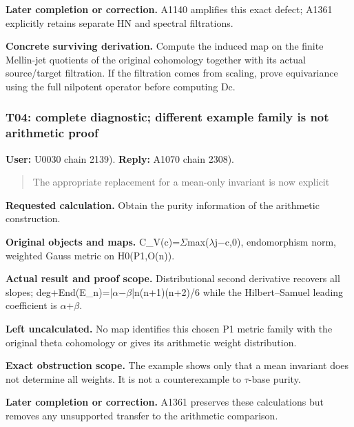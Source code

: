 \documentclass[10pt,a4paper,oneside]{report}
\begin{document}
\textbf{Later completion or correction.} A1140 amplifies this exact
defect; A1361 explicitly retains separate HN and spectral filtrations.

\textbf{Concrete surviving derivation.} Compute the induced map on the
finite Mellin-jet quotients of the original cohomology together with its
actual source/target filtration. If the filtration comes from scaling,
prove equivariance using the full nilpotent operator before computing
Dc.

\subsubsection{T04: complete diagnostic; different example family is not
arithmetic
proof}\label{t04-complete-diagnostic-different-example-family-is-not-arithmetic-proof}

\textbf{User:} U0030
\protect{} chain 2139).
\textbf{Reply:} A1070
\protect{} chain 2308).

\begin{quote}
The appropriate replacement for a mean-only invariant is now explicit
\end{quote}

\textbf{Requested calculation.} Obtain the purity information of the
arithmetic construction.

\textbf{Original objects and maps.}
C\_V(c)=\allowbreak{}\ensuremath{Σ}\allowbreak{}max(\allowbreak{}\ensuremath{λ}\allowbreak{}j\allowbreak{}\ensuremath{−}\allowbreak{}c,0),
endomorphism norm, weighted Gauss metric on H0(P1,O(n)).

\textbf{Actual result and proof scope.} Distributional second derivative
recovers all slopes;
deg+End(E\_n)=|\allowbreak{}\ensuremath{α}\allowbreak{}\allowbreak{}\ensuremath{−}\allowbreak{}\allowbreak{}\ensuremath{β}\allowbreak{}|n(n+1)(n+2)/6
while the Hilbert--Samuel leading coefficient is
\allowbreak{}\ensuremath{α}\allowbreak{}+\allowbreak{}\ensuremath{β}\allowbreak{}.

\textbf{Left uncalculated.} No map identifies this chosen P1 metric
family with the original theta cohomology or gives its arithmetic weight
distribution.

\textbf{Exact obstruction scope.} The example shows only that a mean
invariant does not determine all weights. It is not a counterexample to
\allowbreak{}\ensuremath{τ}\allowbreak{}-base purity.

\textbf{Later completion or correction.} A1361 preserves these
calculations but removes any unsupported transfer to the arithmetic
comparison.
\end{document}
